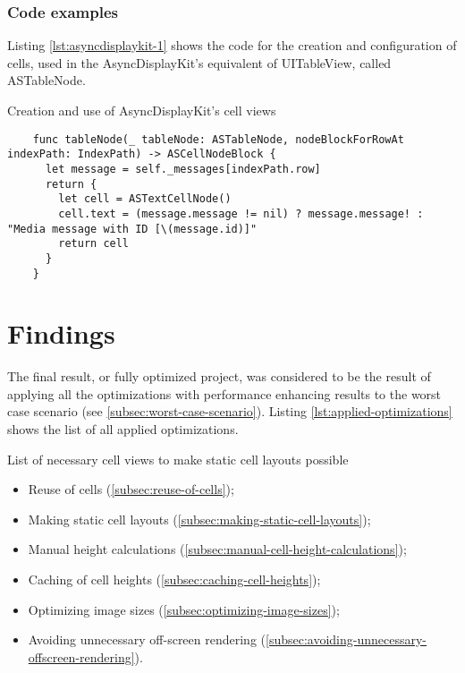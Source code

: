 \documentclass[a4paper,12pt]{article}
\begin{document}
\subsubsection{Code examples}
Listing \ref{lst:asyncdisplaykit-1} shows the code for the creation and configuration of cells, used in the AsyncDisplayKit's equivalent of UITableView, called ASTableNode.
\begin{listing}[H]
  \caption{Creation and use of AsyncDisplayKit's cell views}
  \label{lst:asyncdisplaykit-1}
  \begin{verbatim}
    func tableNode(_ tableNode: ASTableNode, nodeBlockForRowAt indexPath: IndexPath) -> ASCellNodeBlock {
      let message = self._messages[indexPath.row]
      return {
        let cell = ASTextCellNode()
        cell.text = (message.message != nil) ? message.message! : "Media message with ID [\(message.id)]"
        return cell
      }
    }
  \end{verbatim}
\end{listing}

\section{Findings}
The final result, or fully optimized project, was considered to be the result of applying all the optimizations with performance enhancing results to the worst case scenario (see \autoref{subsec:worst-case-scenario}). Listing \ref{lst:applied-optimizations} shows the list of all applied optimizations.

\vspace{1.5em} %
\begin{listing}[H]
  \caption{List of necessary cell views to make static cell layouts possible}
  \label{lst:applied-optimizations}
  \begin{itemize}
    \item Reuse of cells (\autoref{subsec:reuse-of-cells});
    \item Making static cell layouts (\autoref{subsec:making-static-cell-layouts});
    \item Manual height calculations (\autoref{subsec:manual-cell-height-calculations});
    \item Caching of cell heights (\autoref{subsec:caching-cell-heights});
    \item Optimizing image sizes (\autoref{subsec:optimizing-image-sizes});
    \item Avoiding unnecessary off-screen rendering (\autoref{subsec:avoiding-unnecessary-offscreen-rendering}).
  \end{itemize}
\end{listing}
\end{document}
